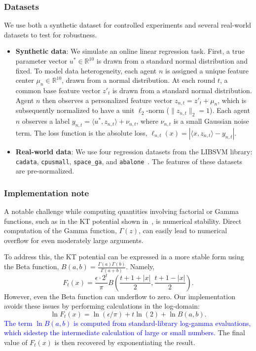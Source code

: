\documentclass[journal]{IEEEtran}
\newcommand{\br}[1]{\left(#1\right)}
\begin{document}
\subsubsection*{Datasets}
We use both a synthetic dataset for controlled experiments and several real-world datasets to test for robustness.
\begin{itemize}
    \item \textbf{Synthetic data}: We simulate an online linear regression task.
          First, a true parameter vector $u^* \in \mathbb{R}^{10}$ is drawn from a standard normal distribution and fixed.
          To model data heterogeneity, each agent $n$ is assigned a unique feature center $\mu_n \in \mathbb{R}^{10}$, drawn from a normal distribution.
          At each round $t$, a common base feature vector $z'_t$ is drawn from a standard normal distribution.
          Agent $n$ then observes a personalized feature vector $z_{n,t} = z'_t + \mu_n$, which is subsequently normalized to have a unit $\ell_2$-norm ($\|z_{n,t}\|_2 = 1$).
          Each agent $n$ observes a label $y_{n,t} = \langle u^*, z_{n,t} \rangle + \nu_{n,t}$, where $\nu_{n,t}$ is a small Gaussian noise term.
          The loss function is the absolute loss, $\ell_{n,t}(x) = |\langle x, z_{n,t} \rangle - y_{n,t}|$.
    \item \textbf{Real-world data}: We use four regression datasets from the LIBSVM library: \texttt{cadata}, \texttt{cpusmall}, \texttt{space\_ga}, and \texttt{abalone}~\cite{chang_libsvm_2011}.
          The features of these datasets are pre-normalized.
\end{itemize}

\subsubsection*{Implementation note}
A notable challenge while computing quantities involving factorial or Gamma functions, such as in the KT potential shown in~, is numerical stability.
Direct computation of the Gamma function, $\Gamma(z)$, can easily lead to numerical overflow for even moderately large arguments.

To address this, the KT potential can be expressed in a more stable form using the Beta function, $B(a,b) = \frac{\Gamma(a)\Gamma(b)}{\Gamma(a+b)}$.
Namely,
\begin{equation}
    F_t(x) = \frac{\epsilon \cdot 2^t}{\pi} B\br{\frac{t+1+|x|}{2}, \frac{t+1-|x|}{2}}.
\end{equation}
However, even the Beta function can underflow to zero.
Our implementation avoids these issues by performing calculations in the log-domain:
\begin{equation}
    \ln F_t(x) = \ln\br{\epsilon / \pi} + t \ln(2) + \ln B\br{a, b}.
\end{equation}
\textcolor{blue}{The term $\ln B(a,b)$ is computed from standard-library log-gamma evaluations, which sidestep the intermediate calculation of large or small numbers.}
The final value of $F_t(x)$ is then recovered by exponentiating the result.
\end{document}
